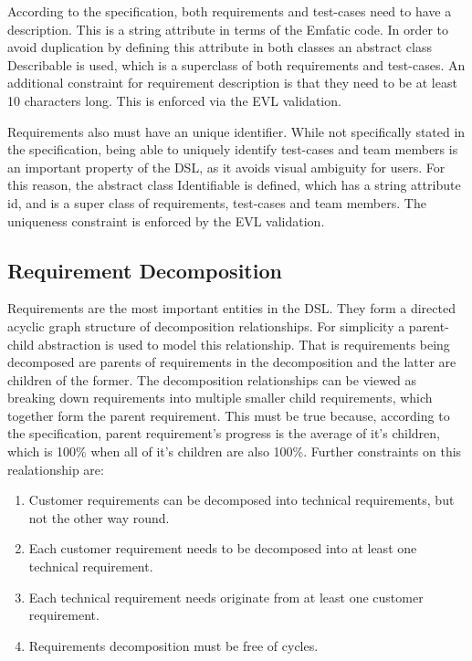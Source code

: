 \documentclass[11pt,a4paper]{article}
\begin{document}
	According to the specification, both requirements and test-cases need to have a description. This is a string attribute in terms of the Emfatic code. In order to avoid duplication by defining this attribute in both classes an abstract class Describable is used, which is a superclass of both requirements and test-cases. An additional constraint for requirement description is that they need to be at least 10 characters long. This is enforced via the EVL \cite{kolovos2010} validation.
	
	Requirements also must have an unique identifier. While not specifically stated in the specification, being able to uniquely identify test-cases and team members is an important property of the DSL, as it avoids visual ambiguity for users. For this reason, the abstract class Identifiable is defined, which has a string attribute id, and is a super class of requirements, test-cases and team members. The uniqueness constraint is enforced by the EVL validation.
	
	\subsection{Requirement Decomposition}
	Requirements are the most important entities in the DSL. They form a directed acyclic graph structure of decomposition relationships. For simplicity a parent-child abstraction is used to model this relationship. That is requirements being decomposed are parents of requirements in the decomposition and the latter are children of the former. The decomposition relationships can be viewed as breaking down requirements into multiple smaller child requirements, which together form the parent requirement. This must be true because, according to the specification, parent requirement's progress is the average of it's children, which is 100\% when all of it's children are also 100\%. Further constraints on this realationship are:
	
	\begin{enumerate}[noitemsep] \label{lst:constraints}
		\item Customer requirements can be decomposed into technical requirements, but not the other way round.
		\item Each customer requirement needs to be decomposed into at least one technical requirement.
		\item Each technical requirement needs originate from at least one customer requirement.
		\item Requirements decomposition must be free of cycles.
	\end{enumerate}
	
\end{document}
